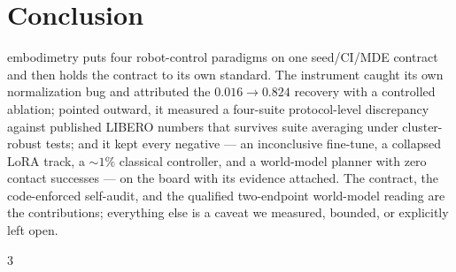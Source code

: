 \documentclass[10pt]{article}
\begin{document}
\section{Conclusion}
embodimetry puts four robot-control paradigms on one seed/CI/MDE
contract and then holds the contract to its own standard. The instrument
caught its own normalization bug and attributed the $0.016\to0.824$
recovery with a controlled ablation; pointed outward, it measured a
four-suite protocol-level discrepancy against published LIBERO numbers
that survives suite averaging under cluster-robust tests; and it kept
every negative --- an inconclusive fine-tune, a collapsed LoRA track, a
${\sim}1\%$ classical controller, and a world-model planner with zero
contact successes --- on the board with its evidence attached. The
contract, the code-enforced self-audit, and the qualified two-endpoint
world-model reading are the contributions; everything else is a caveat we
measured, bounded, or explicitly left open.


\begin{multicols}{3}
{\scriptsize
\setlength{\itemsep}{0pt}


}
\end{multicols}
\end{document}
